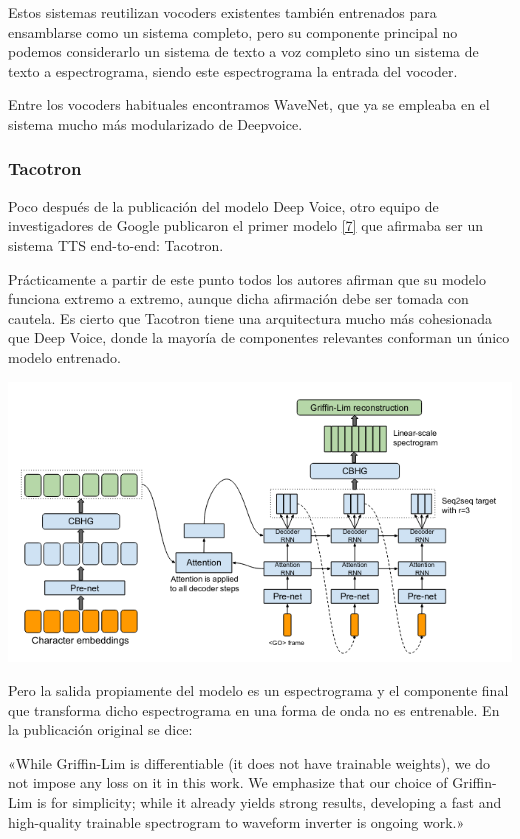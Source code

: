 Estos sistemas reutilizan vocoders existentes también entrenados para ensamblarse como un sistema completo, pero su componente principal no podemos considerarlo un sistema de texto a voz completo sino un sistema de texto a espectrograma, siendo este espectrograma la entrada del vocoder.

Entre los vocoders habituales encontramos WaveNet, que ya se empleaba en el sistema mucho más modularizado de Deepvoice.

\subsubsection{Tacotron}

Poco después de la publicación del modelo Deep Voice, otro equipo de investigadores de Google publicaron el primer modelo \hyperref[EA_5]{[7]} que afirmaba ser un sistema TTS end-to-end: Tacotron.

Prácticamente a partir de este punto todos los autores afirman que su modelo funciona extremo a extremo, aunque dicha afirmación debe ser tomada con cautela. Es cierto que Tacotron tiene una arquitectura mucho más cohesionada que Deep Voice, donde la mayoría de componentes relevantes conforman un único modelo entrenado.

\begin{center}
\includegraphics[width=14cm]{4_estado_del_arte_img/tacotron_0.png}
\end{center}

Pero la salida propiamente del modelo es un espectrograma y el componente final que transforma dicho espectrograma en una forma de onda no es entrenable. En la publicación original se dice:

\begin{displayquote}

«While Griffin-Lim is differentiable (it does not have trainable weights), we do not
impose any loss on it in this work. We emphasize that our choice of Griffin-Lim is for simplicity; while it already yields strong results, developing a fast and high-quality trainable spectrogram to waveform inverter is ongoing work.»

\end{displayquote}

